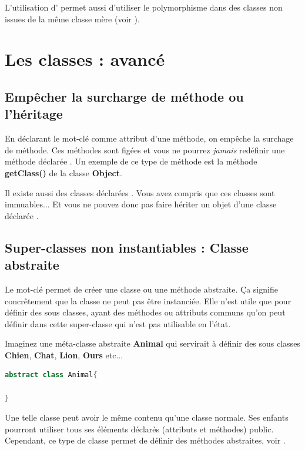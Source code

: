 \documentclass[a4paper,twoside]{article}
\begin{document}
\begin{remarque}
L'utilisation d' permet aussi d'utiliser le polymorphisme dans des classes non issues de la même classe mère (voir ).
\end{remarque}

\section{Les classes : avancé}
\subsection{Empêcher la surcharge de méthode ou l'héritage}
En déclarant le mot-clé  comme attribut d'une méthode, on empêche la surchage de méthode. Ces méthodes sont figées et vous ne pourrez \textit{jamais} redéfinir une méthode déclarée . Un exemple de ce type de méthode est la méthode \textbf{getClass()} de la classe \textbf{Object}.

\begin{remarque}
Il existe aussi des classes déclarées . Vous avez compris que ces classes sont immuables... Et vous ne pouvez donc pas faire hériter un objet d'une classe déclarée .
\end{remarque}

\subsection{Super-classes non instantiables : Classe abstraite}\label{sec:classe_abstraite}
Le mot-clé  permet de créer une classe ou une méthode abstraite. Ça signifie concrêtement que la classe ne peut pas être instanciée. Elle n'est utile que pour définir des sous classes, ayant des méthodes ou attributs communs qu'on peut définir dans cette super-classe qui n'est pas utilisable en l'état.
\begin{exemple}
Imaginez une méta-classe abstraite \textbf{Animal} qui servirait à définir des sous classes \textbf{Chien}, \textbf{Chat}, \textbf{Lion}, \textbf{Ours} etc...
\end{exemple}

\begin{lstlisting}[language=java]
abstract class Animal{
 
}
\end{lstlisting}

Une telle classe peut avoir le même contenu qu'une classe normale. Ses enfants pourront utiliser tous ses éléments déclarés (attributs et méthodes) public. Cependant, ce type de classe permet de définir des méthodes abstraites, voir .
\end{document}
